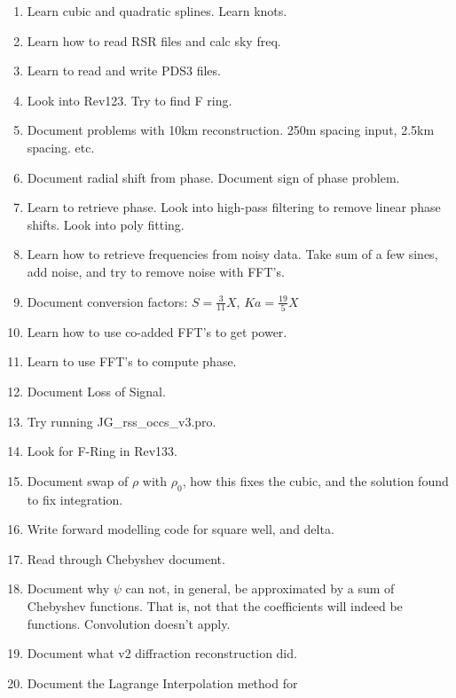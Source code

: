 \documentclass[crop=false,class=article,oneside]{standalone}
\begin{document}
\begin{enumerate}
            \item Learn cubic and quadratic splines. Learn knots.
            \item Learn how to read RSR files and calc sky freq.
            \item Learn to read and write PDS3 files.
            \item Look into Rev123. Try to find F ring.
            \item Document problems with 10km reconstruction.
                  250m spacing input, 2.5km spacing. etc.
            \item Document radial shift from phase. Document
                  sign of phase problem.
            \item Learn to retrieve phase. Look into high-pass filtering
                  to remove linear phase shifts. Look into poly fitting.
            \item Learn how to retrieve frequencies from noisy data.
                  Take sum of a few sines, add noise, and try to remove
                  noise with FFT's.
            \item Document conversion factors:
                  $S=\frac{3}{11}X$, $Ka=\frac{19}{5}X$
            \item Learn how to use co-added FFT's to get power.
            \item Learn to use FFT's to compute phase.
            \item Document Loss of Signal.
            \item Try running JG\_rss\_occs\_v3.pro.
            \item Look for F-Ring in Rev133.
            \item Document swap of $\rho$ with $\rho_{0}$, how this fixes
                  the cubic, and the solution found to fix integration.
            \item Write forward modelling code for square well, and delta.
            \item Read through Chebyshev document.
            \item Document why $\psi$ can not, in general, be
                  approximated by a sum of Chebyshev functions.
                  That is, not that the coefficients will indeed be
                  functions. Convolution doesn't apply.
            \item Document what v2 diffraction reconstruction did.
            \item Document the Lagrange Interpolation method for

\end{enumerate}
\end{document}
